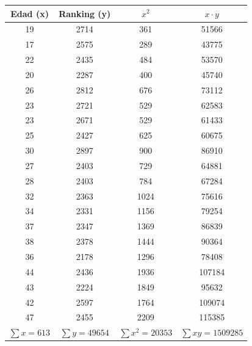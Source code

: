\documentclass[12pt]{article}
\begin{document}
        \vspace{0.5cm}
        \begin{center}
            \renewcommand{\arraystretch}{1.3}
            \begin{tabular}{|c|c|c|c|}
                \hline
                \textbf{Edad (x)} & \textbf{Ranking (y)} & $x^2$ & $x \cdot y$ \\
                \hline
                19 & 2714 & 361 & 51566 \\
                17 & 2575 & 289 & 43775 \\
                22 & 2435 & 484 & 53570 \\
                20 & 2287 & 400 & 45740 \\
                26 & 2812 & 676 & 73112 \\
                23 & 2721 & 529 & 62583 \\
                23 & 2671 & 529 & 61433 \\
                25 & 2427 & 625 & 60675 \\
                30 & 2897 & 900 & 86910 \\
                27 & 2403 & 729 & 64881 \\
                28 & 2403 & 784 & 67284 \\
                32 & 2363 & 1024 & 75616 \\
                34 & 2331 & 1156 & 79254 \\
                37 & 2347 & 1369 & 86839 \\
                38 & 2378 & 1444 & 90364 \\
                36 & 2178 & 1296 & 78408 \\
                44 & 2436 & 1936 & 107184 \\
                43 & 2224 & 1849 & 95632 \\
                42 & 2597 & 1764 & 109074 \\
                47 & 2455 & 2209 & 115385 \\
                \hline
                    \textbf{$\sum x = 613$} & \textbf{$\sum y = 49654$} & \textbf{$\sum x^2 = 20353$} & \textbf{$\sum xy = 1509285$} \\
                \hline
            \end{tabular}
        \end{center}

        \vspace{0.5cm}

\vspace{1cm}
\end{document}

